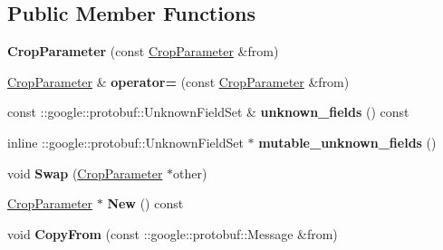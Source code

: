 \subsection*{Public Member Functions}
\begin{DoxyCompactItemize}
\item 
\mbox{\label{classcaffe_1_1_crop_parameter_a11fc893be153e72c143e3e7066b209b5}} 
{\bfseries Crop\+Parameter} (const \mbox{\hyperlink{classcaffe_1_1_crop_parameter}{Crop\+Parameter}} \&from)
\item 
\mbox{\label{classcaffe_1_1_crop_parameter_a3b1dac5abc6cdf5cbb4ebbe881f137c9}} 
\mbox{\hyperlink{classcaffe_1_1_crop_parameter}{Crop\+Parameter}} \& {\bfseries operator=} (const \mbox{\hyperlink{classcaffe_1_1_crop_parameter}{Crop\+Parameter}} \&from)
\item 
\mbox{\label{classcaffe_1_1_crop_parameter_ad022f0eb0d18d1b1c9e1444ca2fb0c2d}} 
const \+::google\+::protobuf\+::\+Unknown\+Field\+Set \& {\bfseries unknown\+\_\+fields} () const
\item 
\mbox{\label{classcaffe_1_1_crop_parameter_a3bcbdd29340afb6ca4f7ba46cf59b922}} 
inline \+::google\+::protobuf\+::\+Unknown\+Field\+Set $\ast$ {\bfseries mutable\+\_\+unknown\+\_\+fields} ()
\item 
\mbox{\label{classcaffe_1_1_crop_parameter_a796f89822c3a44a2d855135a255be66f}} 
void {\bfseries Swap} (\mbox{\hyperlink{classcaffe_1_1_crop_parameter}{Crop\+Parameter}} $\ast$other)
\item 
\mbox{\label{classcaffe_1_1_crop_parameter_a143f8f5840adc8c458db6b8563f71680}} 
\mbox{\hyperlink{classcaffe_1_1_crop_parameter}{Crop\+Parameter}} $\ast$ {\bfseries New} () const
\item 
\mbox{\label{classcaffe_1_1_crop_parameter_a1fea2c328b7baa6a2c37e207ad795fbd}} 
void {\bfseries Copy\+From} (const \+::google\+::protobuf\+::\+Message \&from)
\item 
\mbox{\label{classcaffe_1_1_crop_parameter_adeecd874c28b6d75f7a8d5709d984168}} 

\end{DoxyCompactItemize}

